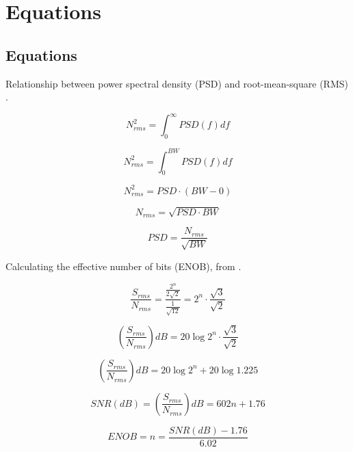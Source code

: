 \chapter[Equations]{Equations}
\label{chap:equations}

\section{Equations}
Relationship between power spectral density (PSD) and root-mean-square (RMS) \cite{freescale_accel_terminology}.

\begin{equation}
N^{2}_{rms}=\int_0^\infty{PSD(f)df}
\label{eq2}
\end{equation}

\begin{equation}
N^{2}_{rms}=\int_0^{BW}{PSD(f)df}
\label{eq3}
\end{equation}

\begin{equation}
N^{2}_{rms}=PSD \cdot (BW - 0)
\label{eq4}
\end{equation}

\begin{equation}
N_{rms}=\sqrt{PSD \cdot BW}
\label{eq5}
\end{equation}

\begin{equation}
PSD = \frac{N_{rms}}{\sqrt{BW}}
\label{eq6}
\end{equation}

\newpage

Calculating the effective number of bits (ENOB), from \cite{freescale_accel_terminology}.

\begin{equation}
\frac{S_{rms}}{N_{rms}} = \frac{\frac{2^n}{2\sqrt{2}}}{\frac{1}{\sqrt{12}}} = 2^n \cdot \frac{\sqrt{3}}{\sqrt{2}}
\label{eq7}
\end{equation}

\begin{equation}
(\frac{S_{rms}}{N_{rms}})dB = 20\log{2^n \cdot \frac{\sqrt{3}}{\sqrt{2}}}
\label{eq8}
\end{equation}

\begin{equation}
(\frac{S_{rms}}{N_{rms}})dB = 20\log{2^n} + 20\log{1.225}
\label{eq9}
\end{equation}

\begin{equation}
SNR(dB) = (\frac{S_{rms}}{N_{rms}})dB = 602n + 1.76
\label{eq10}
\end{equation}

\begin{equation}
ENOB = n = \frac{SNR(dB)-1.76}{6.02}
\end{equation}
